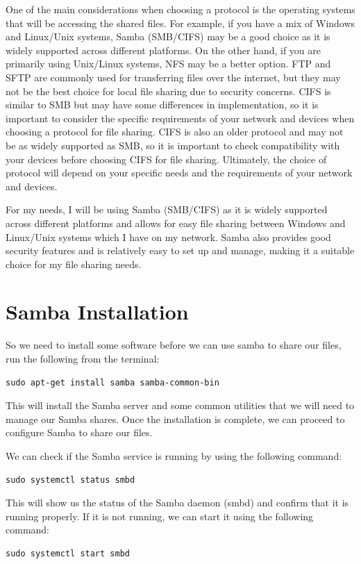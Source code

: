 One of the main considerations when choosing a protocol is the operating systems that will be accessing the shared files. For example, if you have a mix of Windows and Linux/Unix systems, Samba (SMB/CIFS) may be a good choice as it is widely supported across different platforms. On the other hand, if you are primarily using Unix/Linux systems, NFS may be a better option. FTP and SFTP are commonly used for transferring files over the internet, but they may not be the best choice for local file sharing due to security concerns. CIFS is similar to SMB but may have some differences in implementation, so it is important to consider the specific requirements of your network and devices when choosing a protocol for file sharing. CIFS is also an older protocol and may not be as widely supported as SMB, so it is important to check compatibility with your devices before choosing CIFS for file sharing. Ultimately, the choice of protocol will depend on your specific needs and the requirements of your network and devices.

For my needs, I will be using Samba (SMB/CIFS) as it is widely supported across different platforms and allows for easy file sharing between Windows and Linux/Unix systems which I have on my network. Samba also provides good security features and is relatively easy to set up and manage, making it a suitable choice for my file sharing needs.

\section{Samba Installation}
\label{sec:samba:install}

So we need to install some software before we can use samba to share our files,  run the following from the terminal:

\begin{lstlisting}
sudo apt-get install samba samba-common-bin
\end{lstlisting}

This will install the Samba server and some common utilities that we will need to manage our Samba shares. Once the installation is complete, we can proceed to configure Samba to share our files.

We can check if the Samba service is running by using the following command:
\begin{lstlisting}
sudo systemctl status smbd
\end{lstlisting}

This will show us the status of the Samba daemon (smbd) and confirm that it is running properly. If it is not running, we can start it using the following command:
\begin{lstlisting}
sudo systemctl start smbd
\end{lstlisting}

